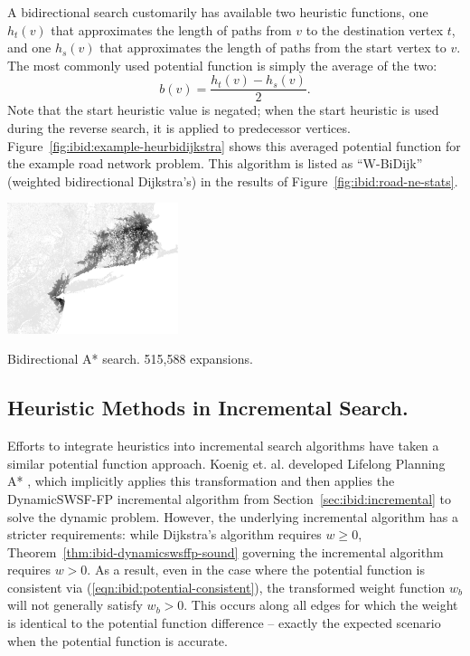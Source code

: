 A bidirectional search customarily has available
two heuristic functions,
one $h_t(v)$ that approximates the length of paths
from $v$ to the destination vertex $t$,
and one $h_s(v)$ that approximates the length of paths
from the start vertex to $v$.
The most commonly used potential function
\citep{ikeda1994betterroutes, goldberg2005spexternalmemory}
is simply the average of the two:
\begin{equation}
   b(v) = \frac{h_t(v) - h_s(v)}{2}.
\end{equation}
Note that the start heuristic value is negated;
when the start heuristic is used during the reverse search,
it is applied to predecessor vertices.
Figure~\ref{fig:ibid:example-heurbidijkstra} shows this averaged
potential function for the example road network problem.
This algorithm is listed as ``W-BiDijk''
(weighted bidirectional Dijkstra's)
in the results of Figure~\ref{fig:ibid:road-ne-stats}.

\begin{marginfigure}%
   \centering%
   \includegraphics[width=5cm]{figs/incbi-road-ne/singleshot/example-heurbidijkstra.png}%
   \caption{Bidirectional A* search.
      515,588 expansions.}%
   \label{fig:ibid:example-heurbidijkstra}%
\end{marginfigure}


\subsection{Heuristic Methods in Incremental Search.}
\label{subsec:ibid:heuristic-incremental}

Efforts to integrate heuristics into incremental search algorithms
have taken a similar potential function approach.
Koenig et. al. developed Lifelong Planning A* \citep{koenig2004lpastar},
which implicitly applies this transformation
and then applies the DynamicSWSF-FP incremental algorithm
\citep{ramalingam1996dynamicswsffp}
from Section~\ref{sec:ibid:incremental}
to solve the dynamic problem.
However,
the underlying incremental algorithm has a stricter requirements:
while Dijkstra's algorithm requires $w \geq 0$,
Theorem~\ref{thm:ibid-dynamicswsffp-sound} governing
the incremental algorithm requires $w > 0$.
As a result,
even in the case where the potential function is consistent
via (\ref{eqn:ibid:potential-consistent}),
the transformed weight function $w_b$ will not generally satisfy
$w_b > 0$.
This occurs along all edges for which the weight is identical to
the potential function difference
-- exactly the expected scenario when the potential function is
accurate.

